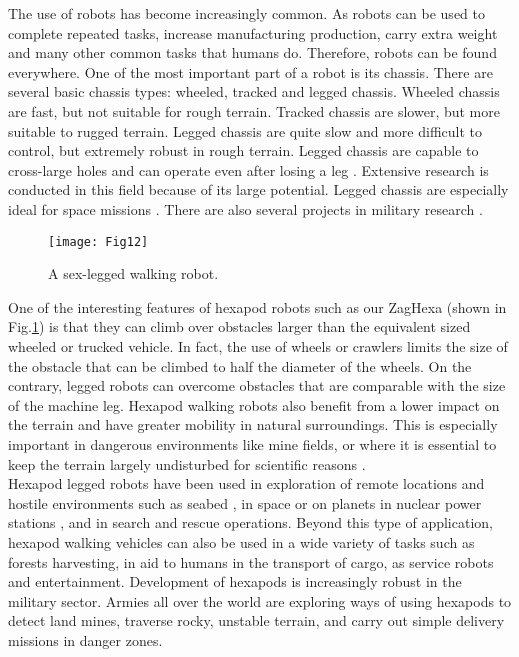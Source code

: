 
The use of robots has become increasingly common. As robots can be used to complete repeated tasks, increase manufacturing production, carry extra weight and many other common tasks that humans do. Therefore, robots can be found everywhere. 
One of the most important part of a robot is its chassis. There are several basic chassis types: wheeled, tracked and legged chassis. Wheeled chassis are fast, but not suitable for rough terrain. Tracked chassis are slower, but more suitable to rugged terrain. Legged chassis are quite slow and more difficult to control, but extremely robust in rough terrain. Legged chassis are capable to cross-large holes and can operate even after losing a leg \cite{1}. Extensive research is conducted in this field because of its large potential. Legged chassis are especially ideal for space missions \cite{2,3} . There are also several projects in military research \cite{4,5}.
\begin{figure}[h]
    \centering
    \texttt{[image: Fig12]}
    \caption{ A sex-legged walking robot.}
    \label{fig1}
\end{figure}

One of the interesting features of hexapod robots such as our ZagHexa (shown in Fig.\ref{fig1}) is that they can climb over obstacles larger than the equivalent sized wheeled or trucked vehicle. In fact, the use of wheels or crawlers limits the size of the obstacle that can be climbed to half the diameter of the wheels. On the contrary, legged robots can overcome obstacles that are comparable with the size of the machine leg\cite{2}. Hexapod walking robots also benefit from a lower impact on the terrain and have greater mobility in natural surroundings. This is especially important in dangerous environments like mine fields, or where it is essential to keep the terrain largely undisturbed for scientific reasons \cite{3}. \\

Hexapod legged robots have been used in exploration of remote locations and hostile environments such as seabed \cite{4}, in space or on planets \cite{5,6}  in nuclear power stations \cite{7}, and in search and rescue operations\cite{8}. Beyond this type of application, hexapod walking vehicles can also be used in a wide variety of tasks such as forests harvesting, in aid to humans in the transport of cargo, as service robots and entertainment. Development of hexapods is increasingly robust in the military sector. Armies all over the world are exploring ways of using hexapods to detect land mines, traverse rocky, unstable terrain, and carry out simple delivery missions in danger zones.

